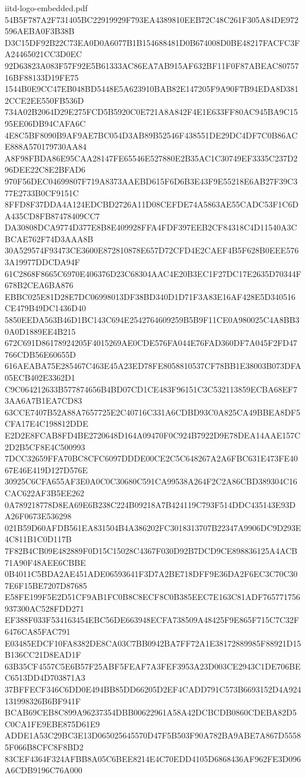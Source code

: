 \begin{filecontents*}[overwrite]{iitd-logo-embedded.pdf}
54B5F787A2F731405BC22919929F793EA4389810EEB72C48C261F305A84DE972596AEBA0F3B38B
D3C15DF92B22C73EA0D0A6077B1B154688481D0B674008D0BE48217FACFC3FA24465021CC3D0EC
92D63823A083F57F92E5B61333AC86EA7AB915AF632BF11F0F87ABEAC8075716BF88133D19FE75
1544B0E9CC47EB048BD5448E5A623910BAB82E147205F9A90F7B94EDA8D3812CCE2EE550FB536D
734A02B2064D29E275FCD5B5920C0E721A8A842F4E1E633FF80AC945BA9C1595EE06DB94CAFA6C
4E8C5BF8090B9AF9AE7BC054D3AB89B52546F438551DE29DC4DF7C0B86ACE888A570179730AA84
A8F98FBDA86E95CAA28147FE65546E527880E2B35AC1C30749EF3335C237D296DEE22C8E2BFAD6
970F56DEC04699807F719A8373AAEBD615F6D6B3E43F9E55218E6AB27F39C377E2733B0CF9151C
8FFD8F37DDA4A124EDCBD2726A11D08CEFDE74A5863AE55CADC53F1C6DA435CD8FB87478409CC7
DA30808DCA9774D377E8B8E409928FFA4FDF397EEB2CF84318C4D11540A3CBCAE762F74D3AAA8B
30A529574F93473CE3600E872810878E657D72CFD4E2CAEF4B5F628B0EEE5763A19977DDCDA94F
61C2868F8665C6970E406376D23C68304AAC4E20B3EC1F27DC17E2635D70344F678B2CEA6BA876
EBBC025E81D28E7DC06998013DF38BD340D1D71F3A83E16AF428E5D340516CE479B49DC1436D40
5850EEDA563B46D1BC143C694E2542764609259B5B9F11CE0A980025C4A8BB30A0D1889EE4B215
672C691D86178924205F4015269AE0CDE576FA044E76FAD360DF7A045F2FD47766CDB56E60655D
616AEABA75E285467C463E45A23ED78FE8058810537CF78BB1E38003B073DFA05ECB402E3362D1
C9C064212633B577874656B4BD07CD1CE483F96151C3C532113859ECBA68EF73AA6A7B1EA7CD83
63CCE7407B52A88A7657725E2C40716C331A6CDBD93C0A825CA49BBEA8DF5CFA17E4C198812DDE
E2D2E8FCAB8FD4BE2720648D164A09470F0C924B7922D9E78DEA14AAE157C2D2B5CF8E4C500993
7DCC32659FFA70BC8CFC6097DDDE00CE2C5C648267A2A6FBC631E473FE4067E46E419D127D576E
30925C6CFA655AF3E0A0C0C30680C591CA99538A264F2C2A86CBD389304C16CAC622AF3B5EE262
0A789218778D8EA69E6B238C224B09218A7B424119C793F514DDC435143E93DA26F0673E536298
021B59D60AFDB561EA831504B4A386202FC3018313707B22347A9906DC9D293E4C811B1C0D117B
7F82B4CB09E482889F0D15C15028C4367F030D92B7DCD9CE898836125A4ACB71A90F48AEE6CBBE
0B4011C5BDA2AE451ADE06593641F3D7A2BE718DFF9E36DA2F6EC3C70C307E6F15BE7207D87685
E58FE199F5E2D51CF9AB1FC0B8C8ECF8C0B385EEC7E163C81ADF765771756937300AC528FDD271
EF388F033F534163454EBC56DE663948ECFA738509A48425F9E865F715C7C32F6476CA85FAC791
E03485EDCF10FA8382DE8CA03C7BB0942BA7FF72A1E38172889985F88921D15B136CC21D8EAD1F
63B35CF4557C5E6B57F25ABF5FEAF7A3FEF3953A23D003CE2943C1DE706BEC6513DD4D703871A3
37BFFECF346C6DD0E494BB85DD66205D2EF4CADD791C573B6693152D4A924131998326B6BF941F
BCAB69CEB8C899A96237354DBB00622961A58A42DCBCDB0860CDEBA82D5C0CA1FE9EBE875D61E9
ADDE1A53C29BC3E13D065025645570D47F5B503F90A782BA9ABE7A867D55585F066B8CFC8F8BD2
83CEF4364F324AFBB8A05C6BEE8214E4C70EDD4105D6868436AF962FE3D096A6CDB9196C76A000

\end{filecontents*}
